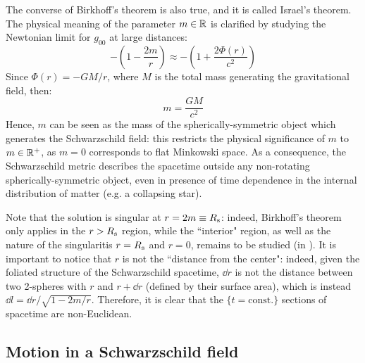 The converse of Birkhoff's theorem is also true, and it is called Israel's theorem. The physical meaning of the parameter $ m \in \mathbb{R} $ is clarified by studying the Newtonian limit for $ g_{00} $ at large distances:
\begin{equation*}
  - \left( 1 - \frac{2m}{r} \right) \approx - \left( 1 + \frac{2 \Phi(r)}{c^2} \right)
\end{equation*}
Since $ \Phi(r) = - GM / r $, where $ M $ is the total mass generating the gravitational field, then:
\begin{equation}
  m = \frac{GM}{c^2}
\end{equation}
Hence, $ m $ can be seen as the mass of the spherically-symmetric object which generates the Schwarzschild field: this restricts the physical significance of $ m $ to $ m \in \mathbb{R}^+ $, as $ m = 0 $ corresponds to flat Minkowski space. As a consequence, the Schwarzschild metric describes the spacetime outside any non-rotating spherically-symmetric object, even in presence of time dependence in the internal distribution of matter (e.g. a collapsing star).

Note that the solution is singular at $ r = 2m \equiv R_\text{s} $: indeed, Birkhoff's theorem only applies in the $ r > R_\text{s} $ region, while the ``interior" region, as well as the nature of the singularitis $ r = R_\text{s} $ and $ r = 0 $, remains to be studied (in ). It is important to notice that $ r $ is not the ``distance from the center": indeed, given the foliated structure of the Schwarzschild spacetime, $ \dd r $ is not the distance between two 2-spheres with $ r $ and $ r + \dd r $ (defined by their surface area), which is instead $ \dd l = \dd r / \sqrt{1 - 2m / r} $. Therefore, it is clear that the $ \{t = \text{const.}\} $ sections of spacetime are non-Euclidean.

\subsection{Motion in a Schwarzschild field}


